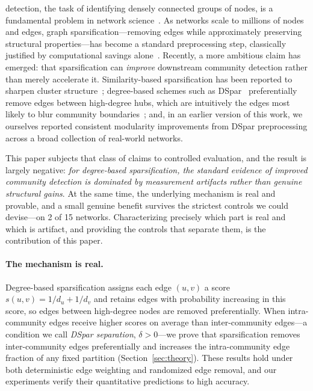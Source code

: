  detection, the task of identifying densely connected groups of nodes, is a fundamental problem in network science~\cite{fortunato202220, karatacs2018application}.
As networks scale to millions of nodes and edges, graph sparsification---removing edges while approximately preserving structural properties---has become a standard preprocessing step, classically justified by computational savings alone~\cite{spielman2008graph, benczur2015randomized}.
Recently, a more ambitious claim has emerged: that sparsification can \emph{improve} downstream community detection rather than merely accelerate it.
Similarity-based sparsification has been reported to sharpen cluster structure~\cite{satuluri2011local}; degree-based schemes such as DSpar~\cite{liu2023dspar} preferentially remove edges between high-degree hubs, which are intuitively the edges most likely to blur community boundaries~\cite{granovetter1973strength, newman2001structure}; and, in an earlier version of this work, we ourselves reported consistent modularity improvements from DSpar preprocessing across a broad collection of real-world networks.

This paper subjects that class of claims to controlled evaluation, and the result is largely negative: \emph{for degree-based sparsification, the standard evidence of improved community detection is dominated by measurement artifacts rather than genuine structural gains}.
At the same time, the underlying mechanism is real and provable, and a small genuine benefit survives the strictest controls we could devise---on 2 of 15 networks.
Characterizing precisely which part is real and which is artifact, and providing the controls that separate them, is the contribution of this paper.

\paragraph{The mechanism is real.}
Degree-based sparsification assigns each edge $(u,v)$ a score $s(u,v) = 1/d_u + 1/d_v$ and retains edges with probability increasing in this score, so edges between high-degree nodes are removed preferentially.
When intra-community edges receive higher scores on average than inter-community edges---a condition we call \emph{DSpar separation}, $\delta > 0$---we prove that sparsification removes inter-community edges preferentially and increases the intra-community edge fraction of any fixed partition (Section~\ref{sec:theory}).
These results hold under both deterministic edge weighting and randomized edge removal, and our experiments verify their quantitative predictions to high accuracy.

